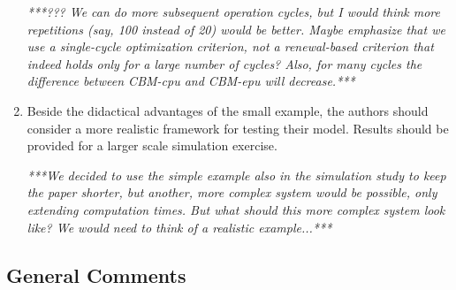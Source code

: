 \documentclass[authoryear]{elsarticle}
\begin{document}
\begin{enumerate}
\emph{***??? We can do more subsequent operation cycles,
but I would think more repetitions (say, 100 instead of 20) would be better.
Maybe emphasize that we use a single-cycle optimization criterion,
not a renewal-based criterion that indeed holds only for a large number of cycles?
Also, for many cycles the difference between CBM-cpu and CBM-epu will decrease.***}

\item Beside the didactical advantages of the small example, the authors should consider a more realistic framework for testing their model. Results should be provided for a larger scale simulation exercise.

\smallskip

\emph{***We decided to use the simple example also in the simulation study to keep the paper shorter,
but another, more complex system would be possible, only extending computation times.
But what should this more complex system look like? We would need to think of a realistic example...***}
\end{enumerate}


\subsection*{General Comments}
\end{document}
